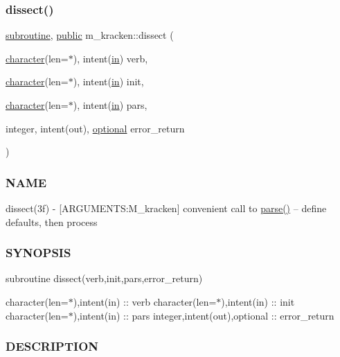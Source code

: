 \subsubsection{\texorpdfstring{dissect()}{dissect()}}
{\footnotesize\ttfamily \hyperlink{M__stopwatch_83_8txt_acfbcff50169d691ff02d4a123ed70482}{subroutine}, \hyperlink{M__stopwatch_83_8txt_a2f74811300c361e53b430611a7d1769f}{public} m\+\_\+kracken\+::dissect (\begin{DoxyParamCaption}\item[{\hyperlink{option__stopwatch_83_8txt_abd4b21fbbd175834027b5224bfe97e66}{character}(len=$\ast$), intent(\hyperlink{M__journal_83_8txt_afce72651d1eed785a2132bee863b2f38}{in})}]{verb,  }\item[{\hyperlink{option__stopwatch_83_8txt_abd4b21fbbd175834027b5224bfe97e66}{character}(len=$\ast$), intent(\hyperlink{M__journal_83_8txt_afce72651d1eed785a2132bee863b2f38}{in})}]{init,  }\item[{\hyperlink{option__stopwatch_83_8txt_abd4b21fbbd175834027b5224bfe97e66}{character}(len=$\ast$), intent(\hyperlink{M__journal_83_8txt_afce72651d1eed785a2132bee863b2f38}{in})}]{pars,  }\item[{integer, intent(out), \hyperlink{option__stopwatch_83_8txt_aa4ece75e7acf58a4843f70fe18c3ade5}{optional}}]{error\+\_\+return }\end{DoxyParamCaption})}



\subsubsection*{N\+A\+ME}

dissect(3f) -\/ \mbox{[}A\+R\+G\+U\+M\+E\+N\+TS\+:M\+\_\+kracken\mbox{]} convenient call to \hyperlink{namespacem__kracken_a495ed7db5c2d301c4d5e623b62a9c295}{parse()} -- define defaults, then process 

\subsubsection*{S\+Y\+N\+O\+P\+S\+IS}

subroutine dissect(verb,init,pars,error\+\_\+return)

character(len=$\ast$),intent(in) \+:\+: verb character(len=$\ast$),intent(in) \+:\+: init character(len=$\ast$),intent(in) \+:\+: pars integer,intent(out),optional \+:\+: error\+\_\+return \subsubsection*{D\+E\+S\+C\+R\+I\+P\+T\+I\+ON}

